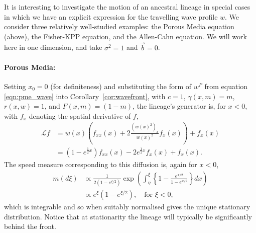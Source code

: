\documentclass[12pt]{article}
\newcommand{\meanq}{\vec b}    %
\newcommand{\Lgen}{\mathcal{L}}    %
\begin{document}
It is interesting to investigate the motion of an ancestral lineage
in special cases in which we have an explicit expression for the travelling
wave profile $w$. 
We consider three relatively well-studied examples:
the Porous Media equation (above),
the Fisher-KPP equation,
and the Allen-Cahn equation.
We will work here in one dimension,
and take $\sigma^2 = 1$ and $\meanq = 0$.

\paragraph{Porous Media:}
Setting $x_0=0$ (for definiteness) and substituting
the form of $w^P$ from equation \eqref{eqn:pme_wave}
into Corollary~\ref{cor:wavefront},
with $c=1$,
$\gamma(x, m) = m$,
$r(x,w) = 1$,
and $F(x, m) = (1 - m)$,
the lineage's generator is, for $x < 0$,
with $f_x$ denoting the spatial derivative of $f$,
\begin{align*}
    \Lgen f
    &=
        w(x)
        \left(
         f_{xx}(x)
         +
         2 \frac{(w(x)^2)_x}{w(x)^2} f_x(x)
        \right)
        + f_x(x) \\
    &=
        \left(1 - e^{\frac{1}{2} x} \right)
        f_{xx}(x)
        -
        2 e^{\frac{1}{2} x} f_x(x)
        +
        f_x(x) .
\end{align*}
The speed measure corresponding to this diffusion is,
again for $x < 0$,
\begin{align*}
    m(d\xi)
    &\propto
        \frac{ 1 }{ 2 (1 - e^{\xi/2}) }
        \exp\left(
            \int_\eta^\xi \left\{
                1 - \frac{e^{x/2}}{1 - e^{x/2}}
            \right\} dx
        \right) \\
    &\propto
        e^\xi\left(1-e^{\xi/2}\right),
        \quad
        \text{for } \xi < 0 ,
\end{align*}
which is integrable and so when suitably normalised gives the unique stationary distribution.
Notice that at stationarity
the lineage will typically be significantly behind the front. 

\end{document}
